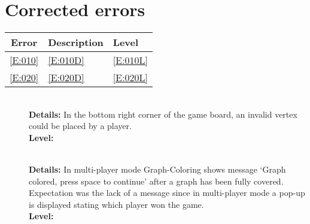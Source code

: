 \section{Corrected errors}

\begin{tabular}{cll}

\hline
	\textbf{Error} & \textbf{Description} & \textbf{Level} \\
	\hline
	\ref{E:010} & \ref{E:010D} & \ref{E:010L} \\
	\ref{E:020} & \ref{E:020D} & \ref{E:020L} \\
	\hline
\end{tabular}

\begin{description}
	\item[] \textbf{} \\
	\textbf{Details:} In the bottom right corner of the \twixt game board, an invalid vertex could be placed by a player. \\
	\textbf{Level:} 

	\item[] \textbf{} \\
	\textbf{Details:} In multi-player mode Graph-Coloring shows message `Graph colored, press space to continue' after a graph has been fully covered. Expectation was the lack of a message since in multi-player mode a pop-up is displayed stating which player won the game. \\
	\textbf{Level:} 
\end{description}

